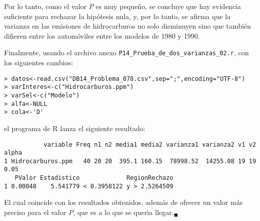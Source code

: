 \begin{solucion}
 \begin{conclusion}
  Por lo tanto, como el valor $P$ es muy peque\~no,
  se concluye que hay evidencia suficiente para rechazar la hip\'otesis nula,
  y, por lo tanto, se afirma que la varianza en las emisiones de hidrocarburos
  no solo disminuyen sino que tambi\'en difieren entre los autom\'oviles
  entre los modelos de 1980 y 1990.
 \end{conclusion}

 Finalmente, usando el archivo anexo \texttt{P14\_Prueba\_de\_dos\_varianzas\_02.r}, con los siguientes cambios:
 \begin{verbatim}
> datos<-read.csv("DB14_Problema_078.csv",sep=";",encoding="UTF-8")
> varInteres<-c("Hidrocarburos.ppm")
> varSel<-c("Modelo")
> alfa<-NULL
> cola<-'D'
 \end{verbatim}
 \vspace{-0.5cm}
 el programa de R lanza el siguiente resultado:
 \begin{verbatim}
           variable Freq n1 n2 media1 media2 varianza1 varianza2 v1 v2 alpha
1 Hidrocarburos.ppm   40 20 20  395.1 160.15  78998.52  14255.08 19 19  0.05
   PValor Estadistico             RegionRechazo
1 0.00048    5.541779 < 0.3958122 y > 2.5264509
 \end{verbatim}
 \vspace{-0.5cm}
 El cual coincide con los resultados obtenidos,
 adem\'as de ofrecer un valor m\'as preciso para el valor $P$,
 que es a lo que se quer\'{\i}a llegar.${}_{\blacksquare}$
\end{solucion}
